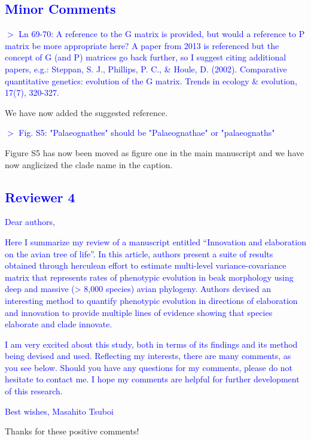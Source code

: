\documentclass[12pt,letterpaper]{article}
\begin{document}
{\subsection*{\textcolor{blue}{Minor Comments}}

\textcolor{blue}{$>$ Ln 69-70: A reference to the G matrix is provided, but would a reference to P matrix be more appropriate here? A paper from 2013 is referenced but the concept of G (and P) matrices go back further, so I suggest citing additional papers, e.g.: Steppan, S. J., Phillips, P. C., \& Houle, D. (2002). Comparative quantitative genetics: evolution of the G matrix. Trends in ecology \& evolution, 17(7), 320-327.}

We have now added the suggested reference.

\textcolor{blue}{$>$ Fig. S5: "Palaeognathes" should be "Palaeognathae" or "palaeognaths"}

Figure S5 has now been moved as figure one in the main manuscript and we have now anglicized the clade name in the caption.

\subsection*{\textcolor{blue}{Reviewer 4}}

\textcolor{blue}{Dear authors,}

\textcolor{blue}{Here I summarize my review of a manuscript entitled “Innovation and elaboration on the avian tree of life”. In this article, authors present a suite of results obtained through herculean effort to estimate multi-level variance-covariance matrix that represents rates of phenotypic evolution in beak morphology using deep and massive (> 8,000 species) avian phylogeny. Authors devised an interesting method to quantify phenotypic evolution in directions of elaboration and innovation to provide multiple lines of evidence showing that species elaborate and clade innovate.}

\textcolor{blue}{I am very excited about this study, both in terms of its findings and its method being devised and used. Reflecting my interests, there are many comments, as you see below. Should you have any questions for my comments, please do not hesitate to contact me. I hope my comments are helpful for further development of this research.}

\textcolor{blue}{Best wishes, Masahito Tsuboi}

Thanks for these positive comments!

}
\end{document}

